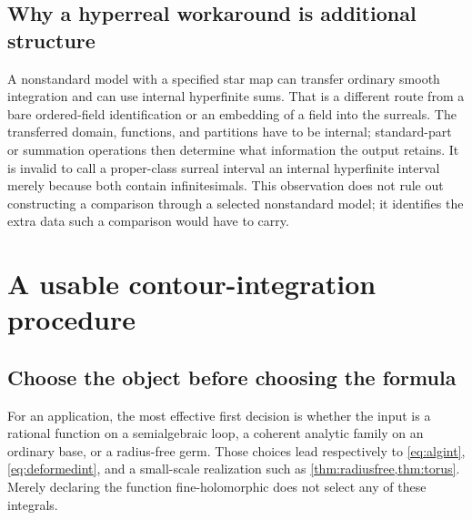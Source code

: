 \documentclass[11pt,letterpaper]{article}
\theoremstyle{definition}
\theoremstyle{remark}
\numberwithin{equation}{section}
\begin{document}
\subsection{Why a hyperreal workaround is additional structure}
A nonstandard model with a specified star map can transfer ordinary smooth integration and can use internal hyperfinite sums. That is a different route from a bare ordered-field identification or an embedding of a field into the surreals. The transferred domain, functions, and partitions have to be internal; standard-part or summation operations then determine what information the output retains. It is invalid to call a proper-class surreal interval an internal hyperfinite interval merely because both contain infinitesimals. This observation does not rule out constructing a comparison through a selected nonstandard model; it identifies the extra data such a comparison would have to carry.

\section{A usable contour-integration procedure}\label{sec:procedure}
\subsection{Choose the object before choosing the formula}
For an application, the most effective first decision is whether the input is a rational function on a semialgebraic loop, a coherent analytic family on an ordinary base, or a radius-free germ. Those choices lead respectively to \eqref{eq:algint}, \eqref{eq:deformedint}, and a small-scale realization such as \cref{thm:radiusfree,thm:torus}. Merely declaring the function fine-holomorphic does not select any of these integrals.
\end{document}
